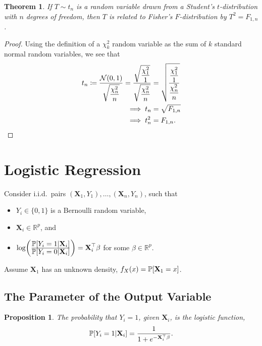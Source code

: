 \documentclass[letterpaper, reqno]{amsart}
\newtheorem{theorem}{Theorem}[section]
\newtheorem{prop}{Proposition}[section]
\numberwithin{equation}{section}
\newcommand{\T}{\top} %
\newcommand{\vect}[1]{\boldsymbol{\mathbf{#1}}} %
\newcommand{\ddfrac}[2]{\frac{\displaystyle #1}{\displaystyle #2}}
\newcommand{\Prob}[1]{\mathbb{P}\mleft[#1\mright]}
\newcommand{\R}{\mathbb{R}}  %
\newcommand{\N}[2]{\mathcal{N}\mleft( #1, #2 \mright)}
\newcommand{\iid}{i.i.d.}
\newcommand{\Xv}{\vect{X}}
\newcommand{\Bv}{\beta}
\begin{document}
\begin{theorem}
  If $T \sim t_n$ is a random variable drawn from a Student's
  $t$-distribution with $n$ degrees of freedom, then $T$ is related to
  Fisher's $F$-distribution by $T^2 = F_{1, n}$.
\end{theorem}

\begin{proof}
  Using the definition of a $\chi^2_k$ random variable as the sum of $k$
  standard normal random variables, we see that
  \begin{align*}
    t_n \coloneqq \ddfrac{\N{0}{1}}{\sqrt{\frac{\chi^2_n}{n}}} 
    = \ddfrac{\sqrt{\frac{\chi^2_1}{1}}}{\sqrt{\frac{\chi^2_n}{n}}} 
    &= \sqrt{\ddfrac{\frac{\chi^2_1}{1}}{\frac{\chi^2_n}{n}}} \\
    \implies t_n &= \sqrt{F_{1, n}} \\
    \implies t_n^2 &= F_{1, n}. \qedhere
  \end{align*}
\end{proof}

\clearpage
\section{Logistic Regression}
Consider \iid\ pairs $(\Xv_1, Y_1), \dots, (\Xv_n, Y_n)$, such that
\begin{itemize}
  \item $Y_i \in \{0, 1\}$ is a Bernoulli random variable,
  \item $\Xv_i \in \R^p$, and
  \item $\log \mleft(\ddfrac{\Prob{Y_i = 1 | \Xv_i}}{\Prob{Y_i = 0 | \Xv_i}} \mright) 
        = \Xv_i^\T \Bv$ for some $\Bv \in \R^p$.
\end{itemize}
Assume $\Xv_1$ has an unknown density, $f_X(x) = \Prob{\Xv_1 = x}$.

\subsection{The Parameter of the Output Variable}
\begin{prop}
  The probability that $Y_i = 1$, given $\Xv_i$, is the logistic function,
  \[ \Prob{Y_i = 1 | \Xv_i} = \frac{1}{1 + e^{-\Xv_i^\T \Bv}}. \]
\end{prop}
\end{document}
